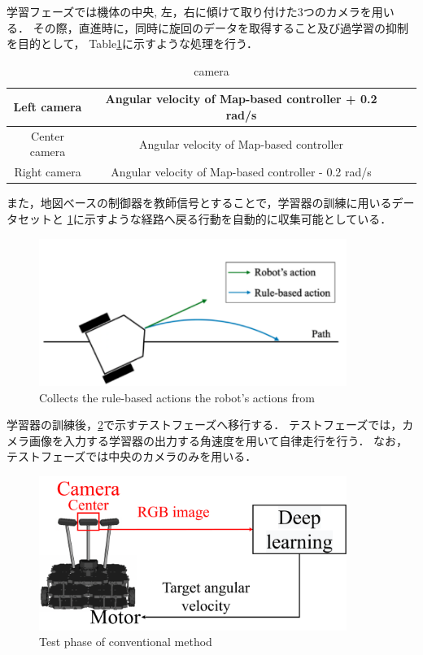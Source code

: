 \newpage
学習フェーズでは機体の中央, 左，右に傾けて取り付けた3つのカメラを用いる．
その際，直進時に，同時に旋回のデータを取得すること及び過学習の抑制を目的として，
Table\ref{tb::camera_ang}に示すような処理を行う．
\begin{table}[H]
    \centering
    \caption{camera }
    \begin{tabular}{|c|c|ll}
    \hline
    Left camera   & Angular velocity of Map-based controller + 0.2 rad/s \\ \hline
    Center camera & Angular velocity of Map-based controller             \\ \hline
    Right camera  & Angular velocity of Map-based controller - 0.2 rad/s  \\ \hline
    \end{tabular}
    \label{tb::camera_ang}
    \end{table}
また，地図べースの制御器を教師信号とすることで，学習器の訓練に用いるデータセットと
\ref{fig::okada_path}に示すような経路へ戻る行動を自動的に収集可能としている．
\begin{figure}[h]
    \centering
    \includegraphics[width = 10cm]{./figs/okada_path.png}
    \caption{Collects the rule-based actions the robot's actions from \cite{okada}}
    \label{fig::okada_path}
\end{figure}

\newpage
学習器の訓練後，\ref{fig::okada_method_test}で示すテストフェーズへ移行する．
テストフェーズでは，カメラ画像を入力する学習器の出力する角速度を用いて自律走行を行う．
なお，テストフェーズでは中央のカメラのみを用いる．
\begin{figure}[h]
    \centering
    \includegraphics[width = 10cm]{./figs/okada_method_test.pdf}
    \caption{Test phase of conventional method}
    \label{fig::okada_method_test}
\end{figure}
